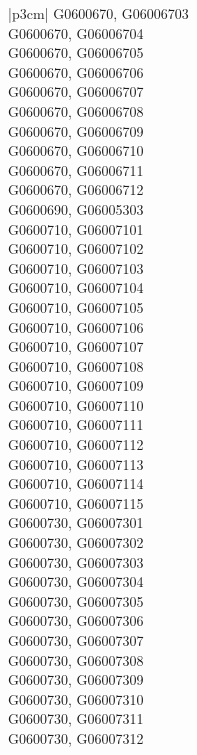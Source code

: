 \begin{customLongTable}{ |p{3cm}| }
G0600670, G06006703 \\ \hline
G0600670, G06006704 \\ \hline
G0600670, G06006705 \\ \hline
G0600670, G06006706 \\ \hline
G0600670, G06006707 \\ \hline
G0600670, G06006708 \\ \hline
G0600670, G06006709 \\ \hline
G0600670, G06006710 \\ \hline
G0600670, G06006711 \\ \hline
G0600670, G06006712 \\ \hline
G0600690, G06005303 \\ \hline
G0600710, G06007101 \\ \hline
G0600710, G06007102 \\ \hline
G0600710, G06007103 \\ \hline
G0600710, G06007104 \\ \hline
G0600710, G06007105 \\ \hline
G0600710, G06007106 \\ \hline
G0600710, G06007107 \\ \hline
G0600710, G06007108 \\ \hline
G0600710, G06007109 \\ \hline
G0600710, G06007110 \\ \hline
G0600710, G06007111 \\ \hline
G0600710, G06007112 \\ \hline
G0600710, G06007113 \\ \hline
G0600710, G06007114 \\ \hline
G0600710, G06007115 \\ \hline
G0600730, G06007301 \\ \hline
G0600730, G06007302 \\ \hline
G0600730, G06007303 \\ \hline
G0600730, G06007304 \\ \hline
G0600730, G06007305 \\ \hline
G0600730, G06007306 \\ \hline
G0600730, G06007307 \\ \hline
G0600730, G06007308 \\ \hline
G0600730, G06007309 \\ \hline
G0600730, G06007310 \\ \hline
G0600730, G06007311 \\ \hline
G0600730, G06007312 \\ \hline

\end{customLongTable}
